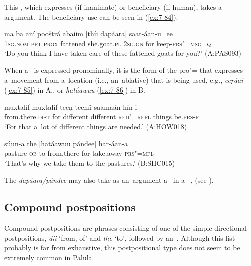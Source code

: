  This , which expresses  (if inanimate) or beneficiary (if human), takes a~ argument. The beneficiary use can be seen in (\ref{ex:7-84}).

\begin{exe}
\ex
\label{ex:7-84}
\gll ma ba aní pooštrá abaíim [thíi dapáara] saat-áan-u=ee \\
\textsc{1sg.nom} \textsc{prt} \textsc{prox} fattened she.goat.\textsc{pl} \textsc{2sg.gn} for keep-\textsc{prs"=msg=q} \\
\glt `Do you think I have taken care of these fattened goats for you?' (A:PAS093)
\end{exe}

When a~ is expressed pronominally, it is the form of the pro"= that expresses a~movement from a~location (i.e., an~ablative) that is being used, e.g., \textit{eeṛáai} (\ref{ex:7-85}) in A., or \textit{hatáawuu} (\ref{ex:7-86}) in B.

\begin{exe}
\ex
\label{ex:7-85}
 muxtalíf muxtalíf teeṇ-teeṇíi saamaán hín-i \\
from.there.\textsc{dist} for different different \textsc{red"=refl}  things be.\textsc{prs-f}  \\
\glt `For that a~lot of different things are needed.' (A:HOW018)
\end{exe}
\begin{exe}
\ex
\label{ex:7-86}
\gll súun-a the [hatáawuu pándee] har-áan-a \\
pasture-\textsc{ob} to from.there for take.away-\textsc{prs"=mpl} \\
\glt `That's why we take them to the pastures.' (B:SHC015)
\end{exe}

The  \textit{dapáara/pándee} may also take as an~argument a~ in a~ , (see ).


\subsection{Compound postpositions}
\label{subsec:7-2-3}

Compound postpositions are phrases consisting of one of the simple directional postpositions, \textit{díi} `from, of' and \textit{the} `to', followed by an~. Although this list probably is far from exhaustive, this postpositional type does not seem to be extremely common in Palula. 

